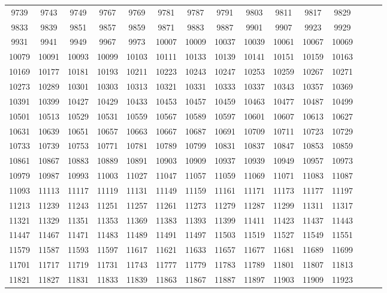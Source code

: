 \documentclass[10pt, a4paper]{article}
\begin{document}
\begin{center}
\begin{longtable}{c c c c c c c c c c c c c c c}
        9739 & 9743 & 9749 & 9767 & 9769 & 9781 & 9787 & 9791 & 9803 & 9811 & 9817 & 9829 \\
        9833 & 9839 & 9851 & 9857 & 9859 & 9871 & 9883 & 9887 & 9901 & 9907 & 9923 & 9929 \\
        9931 & 9941 & 9949 & 9967 & 9973 & 10007 & 10009 & 10037 & 10039 & 10061 & 10067 & 10069 \\
        10079 & 10091 & 10093 & 10099 & 10103 & 10111 & 10133 & 10139 & 10141 & 10151 & 10159 & 10163 \\
        10169 & 10177 & 10181 & 10193 & 10211 & 10223 & 10243 & 10247 & 10253 & 10259 & 10267 & 10271 \\
        10273 & 10289 & 10301 & 10303 & 10313 & 10321 & 10331 & 10333 & 10337 & 10343 & 10357 & 10369 \\
        10391 & 10399 & 10427 & 10429 & 10433 & 10453 & 10457 & 10459 & 10463 & 10477 & 10487 & 10499 \\
        10501 & 10513 & 10529 & 10531 & 10559 & 10567 & 10589 & 10597 & 10601 & 10607 & 10613 & 10627 \\
        10631 & 10639 & 10651 & 10657 & 10663 & 10667 & 10687 & 10691 & 10709 & 10711 & 10723 & 10729 \\
        10733 & 10739 & 10753 & 10771 & 10781 & 10789 & 10799 & 10831 & 10837 & 10847 & 10853 & 10859 \\
        10861 & 10867 & 10883 & 10889 & 10891 & 10903 & 10909 & 10937 & 10939 & 10949 & 10957 & 10973 \\
        10979 & 10987 & 10993 & 11003 & 11027 & 11047 & 11057 & 11059 & 11069 & 11071 & 11083 & 11087 \\
        11093 & 11113 & 11117 & 11119 & 11131 & 11149 & 11159 & 11161 & 11171 & 11173 & 11177 & 11197 \\
        11213 & 11239 & 11243 & 11251 & 11257 & 11261 & 11273 & 11279 & 11287 & 11299 & 11311 & 11317 \\
        11321 & 11329 & 11351 & 11353 & 11369 & 11383 & 11393 & 11399 & 11411 & 11423 & 11437 & 11443 \\
        11447 & 11467 & 11471 & 11483 & 11489 & 11491 & 11497 & 11503 & 11519 & 11527 & 11549 & 11551 \\
        11579 & 11587 & 11593 & 11597 & 11617 & 11621 & 11633 & 11657 & 11677 & 11681 & 11689 & 11699 \\
        11701 & 11717 & 11719 & 11731 & 11743 & 11777 & 11779 & 11783 & 11789 & 11801 & 11807 & 11813 \\
        11821 & 11827 & 11831 & 11833 & 11839 & 11863 & 11867 & 11887 & 11897 & 11903 & 11909 & 11923 \\

\end{longtable}
\end{center}
\end{document}
